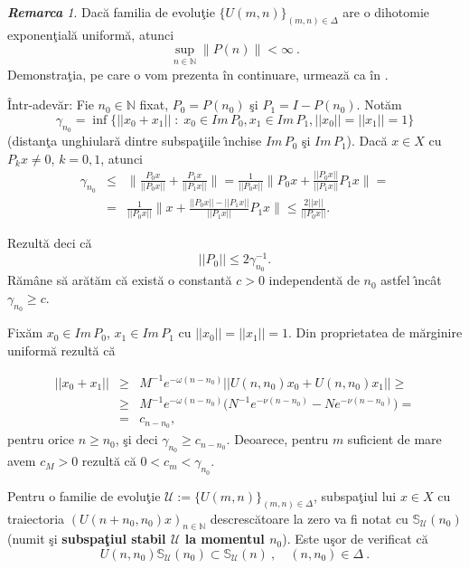 \documentclass[ a4paper, 12pt]{report}
\newcommand{\N}{\mathbb{N}}
\newcommand{\defnemph}[1]{\textbf{#1}}
\theoremstyle{definition}
\theoremstyle{remark}
\newtheorem{remarc}{\bf Remarca}[section]
\numberwithin{equation}{section}
\begin{document}
\begin{remarc}
\label{boundedprojectors}
Dac\u a familia de evolu\c tie $\{U(m,n)\}_{(m,n)\in\Delta}$ are o {dihotomie exponen\c tial\u a uniform\u a}, atunci
$$\sup_{n\in\N}\|P(n)\| <\infty\ .$$
Demonstra\c tia, pe care o vom prezenta \^in continuare, urmeaz\u a ca \^in \cite[Lema~4.2]{MinhRabigerSchnaubelt}.

\^ Intr-adev\u ar: Fie $n_0 \in \mathbb{N}$ fixat, $P_0 = P(n_0)$ \c si $P_1 = I - P(n_0)$. Not\u am
$$\gamma_{n_0} = \inf \{ ||x_0 + x_1|| \; : \; x_0 \in Im\, P_0, x_1 \in Im\, P_1, ||x_0|| = ||x_1|| = 1\}$$
(distan\c ta unghiular\u a dintre subspa\c tiile \^\i nchise $Im\, P_0$ \c si $Im\, P_1$). Dac\u a $x\in X$ cu $P_k x \not= 0$, $k = 0, 1$, atunci 
\begin{eqnarray*}
\gamma_{n_0}&\leq& \lVert \frac{P_0x}{||P_0x||} + \frac{P_1x}{||P_1x||} \rVert = \frac{1}{||P_0x||}\lVert P_0x + \frac{||P_0x||}{||P_1x||} P_1x \rVert = \\
&=& \frac{1}{||P_0x||}\lVert x + \frac{||P_0x|| - ||P_1x||}{||P_1x||} P_1x \rVert \leq \frac{2||x||}{||P_0x||}.
\end{eqnarray*}

Rezult\u a deci c\u a 
$$||P_0|| \leq 2\gamma^{- 1}_{n_0}.$$
R\u am\^ ane s\u a ar\u at\u am c\u a exist\u a o constant\u a $c > 0$ independent\u a de $n_0$ astfel \^\i nc\^ at $\gamma_{n_0} \geq c$.

Fix\u am $x_0 \in Im\, P_0$, $x_1\in Im\, P_1$ cu $||x_0|| = ||x_1|| = 1$. Din proprietatea de m\u arginire uniform\u a rezult\u a c\u a

\begin{eqnarray*}
||x_0 + x_1|| &\geq& M^{-1} e^{- \omega (n - n_0)}|| U(n, n_0)x_0 + U(n, n_0)x_1|| \geq \\
&\geq&  M^{-1} e^{- \omega (n - n_0)}\Big(  N^{-1} e^{- \nu (n - n_0)} -  N e^{- \nu (n - n_0)}\Big)= \\
&=&c_{n - n_0},
\end{eqnarray*}
pentru orice $n \geq n_0$, \c si deci $\gamma_{n_0} \geq c_{n - n_0}$. Deoarece, pentru $m$ suficient de mare avem $c_M > 0$ rezult\u a c\u a $0 < c_m < \gamma_{n _0}$.


\end{remarc}

Pentru o familie de evolu\c tie
$\mathcal{U}:=\{U(m,n)\}_{(m,n)\in\Delta}$, subspa\c tiul lui
$x\in X$ cu traiectoria $(U(n+n_0,n_0)x)_{n\in\N}$
descresc\u atoare la zero va fi notat cu
$\mathbb{S}_{\mathcal{U}}(n_0)$ (numit \c si
\defnemph{subspa\c tiul stabil $\mathcal{U}$ la momentul $n_0$}).
Este u\c sor de verificat c\u a
\begin{equation}
U(n,n_0)\mathbb{S}_{\mathcal{U}}(n_0)\subset \mathbb{S}_{\mathcal{U}}(n)\ ,\quad (n,n_0)\in\Delta\ .
\end{equation}
\end{document}
